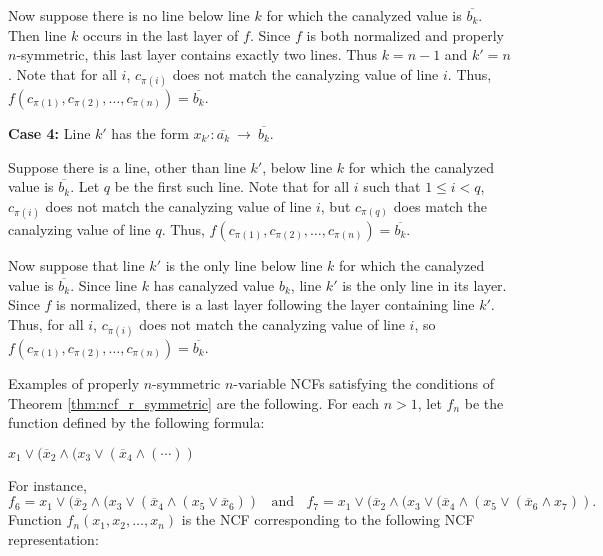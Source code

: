 Now suppose there is no line below line $k$ for which the canalyzed
value is $\overline{b_k}$.  Then line $k$ occurs in the last layer
of $f$.  Since $f$ is both normalized and properly $n$-symmetric,
this last layer contains exactly two lines.  Thus $k = n-1$ and $k'
= n$.  Note that for all $i$, $c_{\pi(i)}$ does not match the
canalyzing value of line $i$.  Thus, $f(c_{\pi(1)}, c_{\pi(2)},
\ldots, c_{\pi(n)}) = \overline{b_k}$.

\medskip

\noindent
{\bf Case 4:} Line $k'$ has the form $x_{k'} : \overline{a_k} ~\longrightarrow~ 
              \overline{b_k}$. 

\smallskip

Suppose there is a line, other than line $k'$, below line $k$ for
which the canalyzed value is $\overline{b_k}$.  Let $q$ be the
first such line.  Note that for all $i$ such that $1 \leq i < q$,
$c_{\pi(i)}$ does not match the canalyzing value of line $i$, but
$c_{\pi(q)}$ does match the canalyzing value of line $q$.  Thus,
$f(c_{\pi(1)}, c_{\pi(2)}, \ldots, c_{\pi(n)}) = \overline{b_k}$.

Now suppose that line $k'$ is the only line below line $k$ for which
the canalyzed value is $\overline{b_k}$.  Since line $k$ has
canalyzed value $b_k$, line $k'$ is the only line in its layer.
Since $f$ is normalized, there is a last layer following the layer
containing line $k'$.  Thus, for all $i$, $c_{\pi(i)}$ does not
match the canalyzing value of line $i$, so $f(c_{\pi(1)}, c_{\pi(2)},
\ldots, c_{\pi(n)}) = \overline{b_k}$.  \QED

\medskip

Examples of properly $n$-symmetric $n$-variable NCFs satisfying the
conditions of Theorem \ref{thm:ncf_r_symmetric} are the following.
For each $n > 1$, let $f_n$ be the function defined by the following
formula:

\smallskip

\hspace*{1in} $x_1 \vee (\overline{x}_2 \wedge ( x_3 \vee (\overline{x}_4 \wedge (\cdots ))$

\smallskip

\noindent
For instance,
\[
f_6 = x_1 \vee (\overline{x}_2 \wedge (x_3 \vee (\overline{x}_4 \wedge (x_5 \vee \overline{x}_6))
~~~~\mathrm{and}~~~~
f_7 = x_1 \vee (\overline{x}_2 \wedge (x_3 \vee (\overline{x}_4 \wedge (x_5 
          \vee (\overline{x}_6 \wedge  x_7)).
\]
Function $f_n(x_1, x_2, \ldots, x_n)$ is the NCF corresponding to
the following NCF representation:

